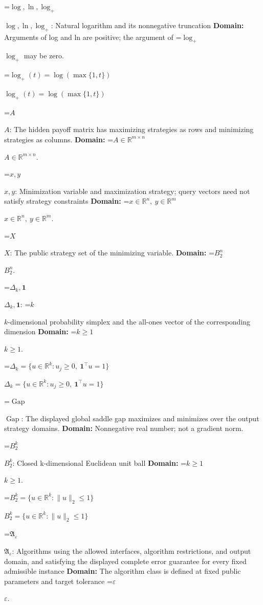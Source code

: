 \documentclass[10pt,a4paper]{article}
\newcommand{\AtlasMath}[1]{\par\begingroup\centering\setbox0=\hbox{$\displaystyle #1$}\ifdim\wd0>1.4\linewidth\typeout{ATLAS WIDE FORMULA: \the\wd0}\fi\ifdim\wd0>\linewidth\resizebox{\linewidth}{!}{\box0}\else\box0\fi\par\endgroup}
\newcommand{\AtlasInlineMath}[1]{\begingroup\setbox0=\hbox{$#1$}\ifdim\wd0>.4\linewidth\endgroup\AtlasMath{#1}\else\endgroup$#1$\fi}
\begin{document}
\AtlasInlineMath{\log,\ln,\log_+}: Natural logarithm and its nonnegative truncation \textbf{Domain:} Arguments of log and ln are positive; the argument of \AtlasInlineMath{\log_+} may be zero.



\AtlasInlineMath{\log_+(t)=\log(\max\{1,t\})}



\AtlasInlineMath{A}: The hidden payoff matrix has maximizing strategies as rows and minimizing strategies as columns. \textbf{Domain:} \AtlasInlineMath{A\in\mathbb R^{m\times n}}.



\AtlasInlineMath{x,y}: Minimization variable and maximization strategy; query vectors need not satisfy strategy constraints \textbf{Domain:} \AtlasInlineMath{x\in\mathbb R^n,\ y\in\mathbb R^m}.



\AtlasInlineMath{X}: The public strategy set of the minimizing variable. \textbf{Domain:} \AtlasInlineMath{B_2^n}.



\AtlasInlineMath{\Delta_k,\mathbf1}: \AtlasInlineMath{k}-dimensional probability simplex and the all-ones vector of the corresponding dimension \textbf{Domain:} \AtlasInlineMath{k\ge1}.



\AtlasInlineMath{\Delta_k=\{u\in\mathbb R^k:u_j\ge0,\ \mathbf1^\top u=1\}}



\AtlasInlineMath{\operatorname{Gap}}: The displayed global saddle gap maximizes and minimizes over the output strategy domains. \textbf{Domain:} Nonnegative real number; not a gradient norm.



\AtlasInlineMath{B_2^k}: Closed k-dimensional Euclidean unit ball \textbf{Domain:} \AtlasInlineMath{k\ge1}.



\AtlasInlineMath{B_2^k=\{u\in\mathbb R^k:\|u\|_2\le1\}}



\AtlasInlineMath{\mathfrak A_\varepsilon}: Algorithms using the allowed interfaces, algorithm restrictions, and output domain, and satisfying the displayed complete error guarantee for every fixed admissible instance \textbf{Domain:} The algorithm class is defined at fixed public parameters and target tolerance \AtlasInlineMath{\varepsilon}.
\end{document}

